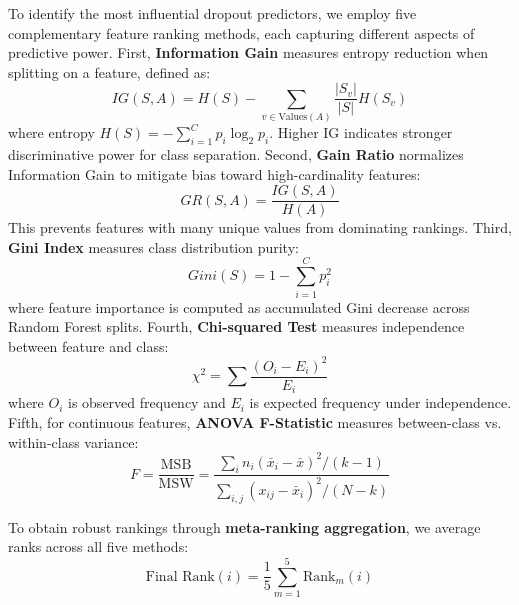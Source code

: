 \documentclass[journal]{IEEEtran}
\begin{document}
To identify the most influential dropout predictors, we employ five complementary feature ranking methods, each capturing different aspects of predictive power. First, \textbf{Information Gain} measures entropy reduction when splitting on a feature, defined as:
\begin{equation}
IG(S, A) = H(S) - \sum_{v \in \text{Values}(A)} \frac{|S_v|}{|S|} H(S_v)
\end{equation}
where entropy $H(S) = -\sum_{i=1}^{C} p_i \log_2 p_i$. Higher IG indicates stronger discriminative power for class separation. Second, \textbf{Gain Ratio} normalizes Information Gain to mitigate bias toward high-cardinality features:
\begin{equation}
GR(S, A) = \frac{IG(S, A)}{H(A)}
\end{equation}
This prevents features with many unique values from dominating rankings. Third, \textbf{Gini Index} measures class distribution purity:
\begin{equation}
Gini(S) = 1 - \sum_{i=1}^{C} p_i^2
\end{equation}
where feature importance is computed as accumulated Gini decrease across Random Forest splits. Fourth, \textbf{Chi-squared Test} measures independence between feature and class:
\begin{equation}
\chi^2 = \sum \frac{(O_i - E_i)^2}{E_i}
\end{equation}
where $O_i$ is observed frequency and $E_i$ is expected frequency under independence. Fifth, for continuous features, \textbf{ANOVA F-Statistic} measures between-class vs. within-class variance:
\begin{equation}
F = \frac{\text{MSB}}{\text{MSW}} = \frac{\sum_{i} n_i (\bar{x}_i - \bar{x})^2 / (k-1)}{\sum_{i,j} (x_{ij} - \bar{x}_i)^2 / (N-k)}
\end{equation}

To obtain robust rankings through \textbf{meta-ranking aggregation}, we average ranks across all five methods:
\begin{equation}
\text{Final Rank}(i) = \frac{1}{5} \sum_{m=1}^{5} \text{Rank}_m(i)
\end{equation}
\end{document}
